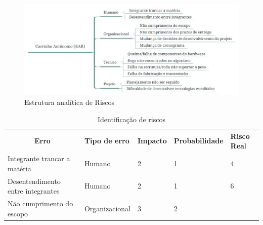 \begin{figure}[ht]
		\centering
		\includegraphics[width=.9\textwidth]{figuras/ear.jpg}
		\caption{Estrutura analítica de Riscos}
		\label{fig:ear}
	\end{figure}

\begin{table}[h]
 \centering
 {\renewcommand\arraystretch{1.25}
 \caption{Identificação de riscos} \label{tab:identificacao_riscos}
 \begin{tabular}{ l l l l l }
  \cline{1-1}\cline{2-2}\cline{3-3}\cline{4-4}\cline{5-5}  
    \multicolumn{1}{|c|}{\textbf{Erro} \centering } &
    \multicolumn{1}{p{2.550cm}|}{\textbf{Tipo de erro} \centering } &
    \multicolumn{1}{p{1.483cm}|}{\textbf{Impacto} \centering } &
    \multicolumn{1}{p{2.600cm}|}{\textbf{Probabilidade} \centering } &
    \multicolumn{1}{p{1.000cm}|}{\textbf{Risco Rea}l \centering }
  \\  
  \cline{1-1}\cline{2-2}\cline{3-3}\cline{4-4}\cline{5-5}  
    \multicolumn{1}{|p{3.850cm}|}{Integrante trancar a matéria \centering } &
    \multicolumn{1}{p{2.550cm}|}{Humano \centering } &
    \multicolumn{1}{p{1.483cm}|}{2 \centering } &
    \multicolumn{1}{p{2.600cm}|}{1 \centering } &
    \multicolumn{1}{p{1.000cm}|}{4 \centering }
  \\  
  \cline{1-1}\cline{2-2}\cline{3-3}\cline{4-4}\cline{5-5}  
    \multicolumn{1}{|p{3.850cm}|}{Desentendimento entre integrantes \centering } &
    \multicolumn{1}{p{2.550cm}|}{Humano \centering } &
    \multicolumn{1}{p{1.483cm}|}{2 \centering } &
    \multicolumn{1}{p{2.600cm}|}{1 \centering } &
    \multicolumn{1}{p{1.000cm}|}{6 \centering }
  \\  
  \cline{1-1}\cline{2-2}\cline{3-3}\cline{4-4}\cline{5-5}  
    \multicolumn{1}{|p{3.850cm}|}{Não cumprimento do escopo \centering } &
    \multicolumn{1}{p{2.550cm}|}{Organizacional \centering } &
    \multicolumn{1}{p{1.483cm}|}{3 \centering } &
    \multicolumn{1}{p{2.600cm}|}{2 \centering } &

\end{tabular}}
\end{table}
